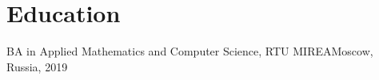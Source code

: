 \section{Education}
\begin{educationEntry}{BA in Applied Mathematics and Computer Science, RTU MIREA}{Moscow, Russia, 2019}
\end{educationEntry}
